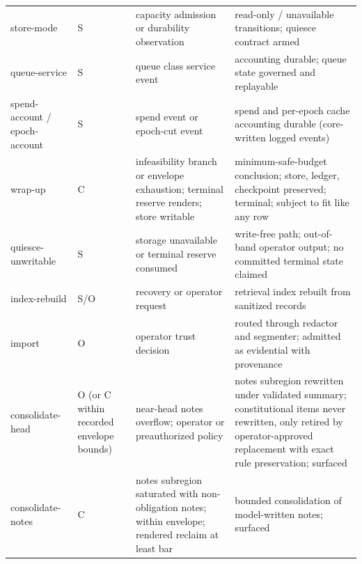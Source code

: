 \documentclass[11pt]{article}
\begin{document}
{\begin{longtable}{@{}p{2.35cm}p{1.15cm}p{4.6cm}p{5.6cm}@{}}
store-mode & S & capacity admission or durability observation & read-only / unavailable transitions; quiesce contract armed \\
queue-service & S & queue class service event & accounting durable; queue state governed and replayable \\
spend-account / epoch-account & S & spend event or epoch-cut event & spend and per-epoch cache accounting durable (core-written logged events) \\
wrap-up & C & infeasibility branch or envelope exhaustion; terminal reserve renders; store writable & minimum-safe-budget conclusion; store, ledger, checkpoint preserved; terminal; subject to fit like any row \\
quiesce-unwritable & S & storage unavailable or terminal reserve consumed & write-free path; out-of-band operator output; no committed terminal state claimed \\
index-rebuild & S/O & recovery or operator request & retrieval index rebuilt from sanitized records \\
import & O & operator trust decision & routed through redactor and segmenter; admitted as evidential with provenance \\
consolidate-head & O (or C within recorded envelope bounds) & near-head notes overflow; operator or preauthorized policy & notes subregion rewritten under validated summary; constitutional items never rewritten, only retired by operator-approved replacement with exact rule preservation; surfaced \\
consolidate-notes & C & notes subregion saturated with non-obligation notes; within envelope; rendered reclaim at least bar & bounded consolidation of model-written notes; surfaced \\
\bottomrule
\end{longtable}
}
\end{document}

